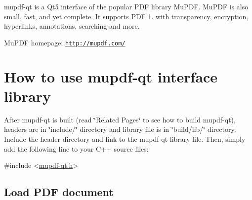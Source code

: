 mupdf-\/qt is a Qt5 interface of the popular P\-D\-F library Mu\-P\-D\-F. Mu\-P\-D\-F is also small, fast, and yet complete. It supports P\-D\-F 1. with transparency, encryption, hyperlinks, annotations, searching and more.

Mu\-P\-D\-F homepage\-: \href{http://mupdf.com/}{\tt http\-://mupdf.\-com/}\hypertarget{index_usage}{}\section{How to use mupdf-\/qt interface library}\label{index_usage}
After mupdf-\/qt is built (read \char`\"{}\-Related Pages\char`\"{} to see how to build mupdf-\/qt), headers are in \char`\"{}include/\char`\"{} directory and library file is in \char`\"{}build/lib/\char`\"{} directory. Include the header directory and link to the mupdf-\/qt library file. Then, simply add the following line to your C++ source files\-:


\begin{DoxyCode}
\textcolor{preprocessor}{#include <\hyperlink{mupdf-qt_8h}{mupdf-qt.h}>}
\end{DoxyCode}
\hypertarget{index_document}{}\subsection{Load P\-D\-F document}\label{index_document}

